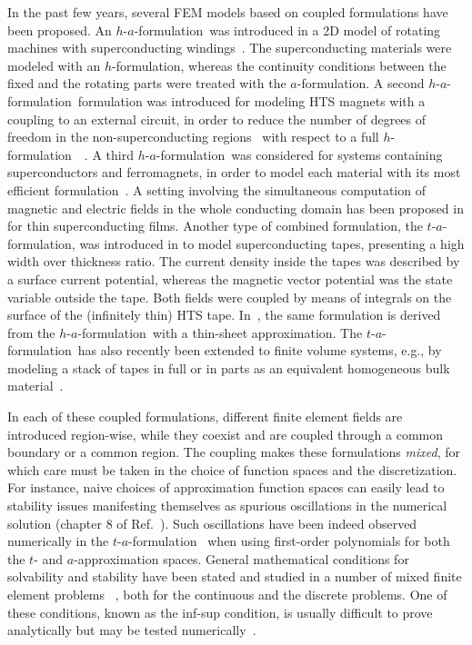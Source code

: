 \documentclass[journal]{IEEEtran}
\newcommand{\hf}{$h$-formulation\ }
\newcommand{\haf}{$h$-$a$-formulation\ }
\newcommand{\taf}{$t$-$a$-formulation\ }
\newcommand{\afOnly}{$a$-formulation}
\newcommand{\hfOnly}{$h$-formulation}
\newcommand{\tafOnly}{$t$-$a$-formulation}
\begin{document}
In the past few years, several FEM models based on coupled formulations have been proposed. An \haf was introduced in a 2D model of rotating machines with superconducting windings~\cite{Brambilla2018}. The superconducting materials were modeled with an \hfOnly, whereas the continuity conditions between the fixed and the rotating parts were treated with the \afOnly. A second \haf formulation was introduced for modeling HTS magnets with a coupling to an external circuit, in order to reduce the number of degrees of freedom in the non-superconducting regions~\cite{Bortot} with respect to a full \hf~\cite{Hong2006,Shen2020}. A third \haf was considered for systems containing superconductors and ferromagnets, in order to model each material with its most efficient formulation~\cite{dular2019finite}. A setting involving the simultaneous computation of magnetic and electric fields in the whole conducting domain has been proposed in \cite{barrett2012electric} for thin superconducting films. Another type of combined formulation, the \tafOnly, was introduced in \cite{zhang2016efficient} to model superconducting tapes, presenting a high width over thickness ratio. The current density inside the tapes was described by a surface current potential, whereas the magnetic vector potential was the state variable outside the tape. Both fields were coupled by means of integrals on the surface of the (infinitely thin) HTS tape. In~\cite{Bortot}, the same formulation is derived from the \haf with a thin-sheet approximation. The \taf has also recently been extended to finite volume systems, e.g., by modeling a stack of tapes in full or in parts as an equivalent homogeneous bulk material~\cite{berrospe2019real,Wang2020}.

In each of these coupled formulations, different finite element fields
are introduced region-wise, while they coexist and are coupled through
a common boundary or a common region. The coupling makes these
formulations \textit{mixed}, for which care must be taken in the
choice of function spaces and the discretization. For instance, naive
choices of approximation function spaces can easily lead to stability
issues manifesting themselves as spurious oscillations in the numerical
solution (chapter 8 of Ref.~\cite{brezziBook}). Such oscillations have been indeed
observed numerically in the \taf \cite{berrospe2019real} when
using first-order polynomials for both the $t$- and $a$-approximation
spaces. General mathematical conditions for solvability and stability
have been stated and studied in a number of mixed finite element
problems ~\cite{brezziBook, bathe2001inf, babuvska1973finite}, both for the continuous
and the discrete problems. One of these conditions, known as the
inf-sup condition, is usually difficult to prove analytically but may
be tested numerically~\cite{bathe2001inf}.
\end{document}
